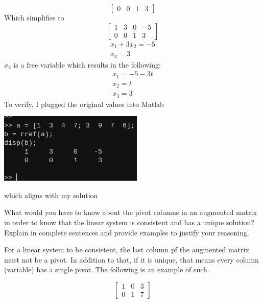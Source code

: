 \documentclass[12pt,letterpaper, onecolumn]{exam}
\begin{document}
\begin{questions}
\begin{solution}
$$\begin{bmatrix}
                0 & 0 & 1 & 3
            \end{bmatrix}
            $$
            Which simplifies to
            $$
            \begin{bmatrix}
                1 & 3 & 0 & -5\\
                0 & 0 & 1 & 3
            \end{bmatrix}
            $$
            $$
            \begin{matrix}
                x_1 + 3x_2 = -5\\
                x_3 = 3
            \end{matrix}
            $$
            $x_2$ is a free variable which results in the following:
            $$
            \begin{matrix}
                x_1 = -5 -3t\\
                x_2 = t\\
                x_3 = 3
            \end{matrix}
            $$
            To verify, I plugged the original values into Matlab\\
            \begin{center}
                \includegraphics{matlab-verify}
            \end{center}
            which aligns with my solution
        \end{solution}

    \question What would you have to know about the pivot columns in an augmented
        matrix in order to know that the linear system is consistent and has a
        unique solution? Explain in complete sentences and provide examples to
        justify your reasoning.
    
        \begin{solution}
            For a linear system to be consistent, the last column pf the augmented matrix must not be a pivot. In addition to that, if it is unique, that means every column (variable) has a single pivot. The following is an example of such.

            $$
            \begin{bmatrix}
                1 & 0 & 3\\
                0 & 1 & 7
            \end{bmatrix}
            $$


\end{solution}
\end{questions}
\end{document}
